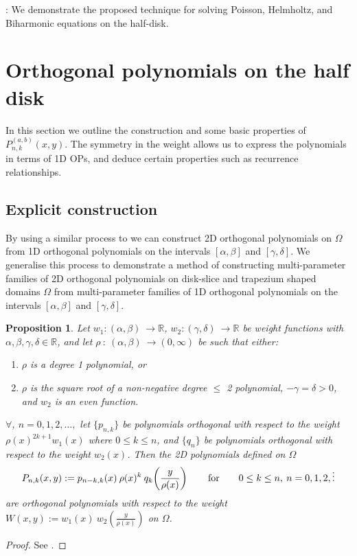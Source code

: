 \documentclass[11pt, oneside]{article}   	%
\newcommand{\R}{\mathbb{R}}
\newcommand{\Pnk}{P_{n,k}}
\newtheorem{proposition}{Proposition}
\begin{document}
\noindent{}: We demonstrate the proposed technique for solving Poisson, Helmholtz, and Biharmonic equations on the half-disk.  


\section{Orthogonal polynomials on the half disk}\label{Section:OPs}

In this section we outline the construction and some basic properties of $P_{n,k}^{(a,b)}(x,y)$. The symmetry in the weight allows us to express the polynomials in terms of 1D OPs, and deduce certain properties such as recurrence relationships. 

\subsection{Explicit construction}

By using a similar process to \cite[p55--56]{dunkl2014orthogonal} we can construct 2D orthogonal polynomials on $\Omega$ from 1D orthogonal polynomials on the intervals \([\alpha,\beta]\) and \([\gamma,\delta]\). We generalise this process to demonstrate a method of constructing multi-parameter families of 2D orthogonal polynomials on disk-slice and trapezium shaped domains $\Omega$ from multi-parameter families of 1D orthogonal polynomials on the intervals \([\alpha,\beta]\) and \([\gamma,\delta]\).

\begin{proposition}
Let \(w_1 : (\alpha,\beta) \: \to \R\), \(w_2 : (\gamma,\delta) \: \to \R\) be weight functions with \(\alpha,\beta,\gamma,\delta \in \R\), and let \(\rho \: : \: (\alpha,\beta) \: \to (0,\infty)\) be such that either:
\begin{enumerate}
\item  \(\rho\) is a degree 1 polynomial, or 
\item \(\rho\) is the square root of a non-negative degree \(\le\) 2 polynomial, \(-\gamma = \delta > 0\), and \(w_2\) is an even function.
\end{enumerate}
$\forall$, $n = 0,1,2,\dots, $ let $\{p_{n,k}\}$ be polynomials orthogonal with respect to the weight $\rho(x)^{2k+1} w_1(x)$ where $0 \le k \le n$, and $\{q_{n}\}$ be polynomials orthogonal with respect to the weight $w_2(x)$. Then the 2D polynomials defined on $\Omega$
$$
\Pnk(x,y) := p_{n-k,k}(x) \: \rho(x)^k \: q_k\fpr(\frac{y}{\rho(x)}) \qquad\hbox{for} \qquad 0 \le k \le n, \: n = 0,1,2,\dots
$$
are orthogonal polynomials with respect to the weight \(W(x,y) := w_1(x) \: w_2(\frac{y}{\rho(x)}) \) on $\Omega$. 
\end{proposition}
\begin{proof}
See \cite[p55--56]{dunkl2014orthogonal}.
\end{proof}
\end{document}
